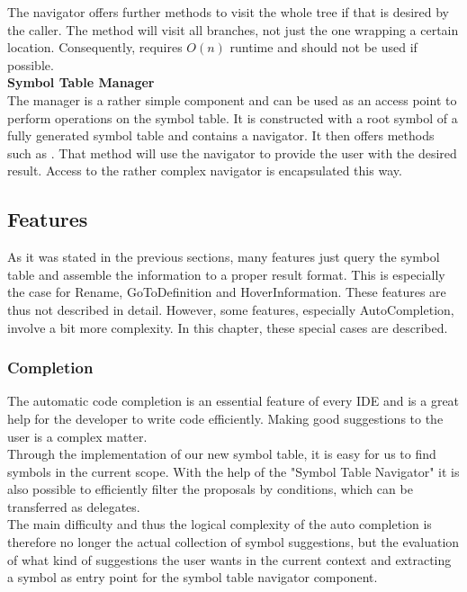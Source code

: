 The navigator offers further methods to visit the whole tree if that is desired by the caller.
The method  will visit all branches, not just the one wrapping a certain location.
Consequently,  requires $O(n)$ runtime and should not be used if possible.\\



\textbf{Symbol Table Manager}\\
The manager is a rather simple component and can be used as an access point to perform operations on the symbol table.
It is constructed with a root symbol of a fully generated symbol table and contains a navigator.
It then offers methods such as .
That method will use the navigator to provide the user with the desired result.
Access to the rather complex navigator is encapsulated this way.



\subsection{Features}
\label{section:imp:features}
As it was stated in the previous sections, many features just query the symbol table and assemble the information to a proper result format.
This is especially the case for Rename, GoToDefinition and HoverInformation.
These features are thus not described in detail.
However, some features, especially AutoCompletion, involve a bit more complexity.
In this chapter, these special cases are described.

\subsubsection{Completion}
\label{section:implementation:core:completion}
The automatic code completion is an essential feature of every IDE and is a great help for the developer to write code efficiently.
Making good suggestions to the user is a complex matter. \\

Through the implementation of our new symbol table, it is easy for us to find symbols in the current scope.
With the help of the "Symbol Table Navigator"
it is also possible to efficiently filter the proposals by conditions,
which can be transferred as delegates. \\

The main difficulty and thus the logical complexity of the auto completion
is therefore no longer the actual collection of symbol suggestions,
but the evaluation of what kind of suggestions the user wants in the current context
and extracting a symbol as entry point for the symbol table navigator component. \\

